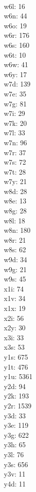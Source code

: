 \begin{multicols}{8}
  \\w6l: 16
  \\w6n: 44
  \\w6o: 19
  \\w6r: 176
  \\w6s: 160
  \\w6t: 10
  \\w6w: 41
  \\w6y: 17
  \\w7d: 139
  \\w7e: 35
  \\w7g: 81
  \\w7i: 29
  \\w7k: 20
  \\w7l: 33
  \\w7n: 96
  \\w7r: 37
  \\w7s: 72
  \\w7t: 28
  \\w7y: 21
  \\w8d: 28
  \\w8e: 13
  \\w8g: 28
  \\w8l: 18
  \\w8n: 180
  \\w8r: 21
  \\w8s: 62
  \\w9d: 34
  \\w9g: 21
  \\w9s: 45
  \\x1i: 74
  \\x1v: 34
  \\x1x: 19
  \\x2i: 56
  \\x2y: 30
  \\x3i: 33
  \\x3s: 53
  \\y1s: 675
  \\y1t: 476
  \\y1u: 5361
  \\y2d: 94
  \\y2k: 193
  \\y2r: 1539
  \\y3d: 33
  \\y3e: 119
  \\y3g: 622
  \\y3h: 65
  \\y3l: 76
  \\y3s: 656
  \\y3v: 11
  \\y4d: 11

\end{multicols}
